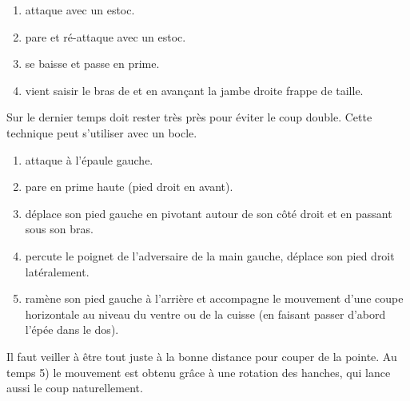 \begin{technique}

\begin{enumerate}
	\item \A attaque avec un estoc.
	
	\item \D pare et ré-attaque avec un estoc.
	
	\item \A se baisse et passe en prime. 
	
	\item \A vient saisir le bras de \D et en avançant la jambe droite frappe de taille.
\end{enumerate}

Sur le dernier temps \A doit rester très près pour éviter le coup double.
Cette technique peut s'utiliser avec un bocle.

\end{technique}


\begin{technique}

\begin{enumerate}
	\item \A attaque à l'épaule gauche.
	
	\item \D pare en prime haute (pied droit en avant).
	
	\item \D déplace son pied gauche en pivotant autour de son côté droit et en passant sous son bras.
	
	\item \D percute le poignet de l'adversaire de la main gauche, déplace son pied droit latéralement.
	
	\item \D ramène son pied gauche à l'arrière et accompagne le mouvement d'une coupe horizontale au niveau du ventre ou de la cuisse (en faisant passer d'abord l'épée dans le dos).
\end{enumerate}

Il faut veiller à être tout juste à la bonne distance pour couper de la pointe.
Au temps 5) le mouvement est obtenu grâce à une rotation des hanches, qui lance aussi le coup naturellement.
\end{technique}



